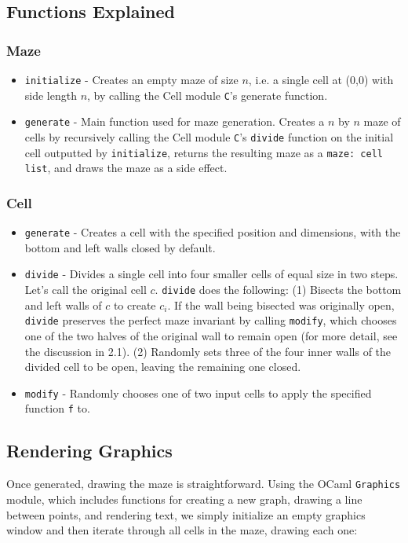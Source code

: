 \documentclass[11pt, margin=1in]{article}
\begin{document}
\subsection{Functions Explained} %

\subsubsection{Maze}
\begin{itemize}
\item \texttt{initialize} - Creates an empty maze of size $n$, i.e. a single cell at (0,0) with side length $n$, by calling the Cell module \texttt{C}'s generate function.
\item \texttt{generate} - Main function used for maze generation. Creates a $n$ by $n$ maze of cells by recursively calling the Cell module \texttt{C}'s \texttt{divide} function on the initial cell outputted by \texttt{initialize}, returns the resulting maze as a \texttt{maze: cell list}, and draws the maze as a side effect.
\end{itemize}

\subsubsection{Cell}
\begin{itemize}
\item \texttt{generate} - Creates a cell with the specified position and dimensions, with the bottom and left walls closed by default. 
\item \texttt{divide} - Divides a single cell into four smaller cells of equal size in two steps. Let's call the original cell $c$. \texttt{divide} does the following: (1) Bisects the bottom and left walls of $c$ to create $c_i$. If the wall being bisected was originally open, \texttt{divide} preserves the perfect maze invariant by calling \texttt{modify}, which chooses one of the two halves of the original wall to remain open (for more detail, see the discussion in 2.1). (2) Randomly sets three of the four inner walls of the divided cell to be open, leaving the remaining one closed.  
\item \texttt{modify} - Randomly chooses one of two input cells to apply the specified function \texttt{f} to. 
\end{itemize}

\subsection{Rendering Graphics} %
Once generated, drawing the maze is straightforward. Using the OCaml \texttt{Graphics} module, which includes functions for creating a new graph, drawing a line between points, and rendering text, we simply initialize an empty graphics window and then iterate through all cells in the maze, drawing each one:
\end{document}
